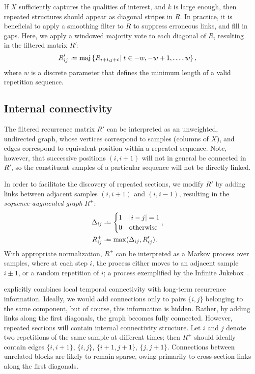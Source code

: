 \documentclass{article}
\begin{document}

If $X$ sufficiently captures the qualities of interest, and $k$ is large
enough, then repeated structures should appear as diagonal stripes in $R$.
In practice, it is beneficial to apply a smoothing filter to $R$ to suppress erroneous
links, and fill in gaps.  Here, we apply a windowed majority vote to each diagonal of
$R$, resulting in the filtered matrix $R'$:
\begin{equation}
R'_{ij} \defeq \maj\left\{ R_{i+t, j+t} \given t \in -w, -w+1, \dots, w\right\},
\label{filtered-rep}
\end{equation}
where $w$ is a discrete parameter that defines the minimum length of a valid
repetition sequence.

\subsection{Internal connectivity}
The filtered recurrence matrix $R'$ can be interpreted as an unweighted, undirected 
graph, whose vertices correspond to samples (columns of $X$), and edges correspond 
to equivalent position within a repeated sequence. Note, however, that successive 
positions $(i, i+1)$ will not in general be connected in $R'$, so the constituent 
samples of a particular sequence will not be directly linked.

In order to facilitate the discovery of repeated sections, we modify $R'$ by 
adding links between adjacent samples $(i, i+1)$ and $(i, i-1)$, resulting in the
\emph{sequence-augmented graph} $R^+$:
\begin{eqnarray}
\Delta_{ij} &\defeq \begin{cases}
1 & |i - j| = 1\\
0 & \text{otherwise}
\end{cases},\\
R^+_{ij} &\defeq \max(\Delta_{ij}, R'_{ij})\label{pathmatrix}.
\end{eqnarray}
With appropriate normalization, $R^+$ can be interpreted as a Markov process
over samples, where at each step $i$, the process either moves to an adjacent
sample $i\pm1$, or a random repetition of $i$; a process exemplified by the 
Infinite Jukebox~\cite{infinitejukebox}.

 explicitly combines local temporal connectivity with long-term
recurrence information.  Ideally, we would add connections only to pairs $\{i,j\}$
belonging to the same component, but of course, this information is hidden.  Rather,
by adding links along the first diagonals, the graph becomes fully connected.  
However, repeated sections will contain internal connectivity structure.  Let $i$ and
$j$ denote two repetitions of the same sample at different times; then $R^+$ should
ideally contain edges $\{i, i+1\}$, $\{i, j\}$, $\{i+1, j+1\}$, $\{j, j+1\}$.
Connections between unrelated blocks are likely to remain sparse, owing primarily to
cross-section links along the first diagonals.  
\end{document}
